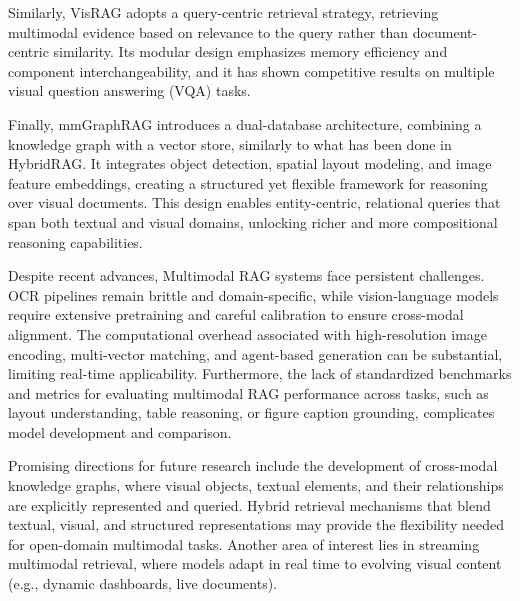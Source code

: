 \documentclass[12pt,twoside]{report}
\begin{document}
Similarly, VisRAG\cite{VisRAG} adopts a query-centric retrieval strategy, retrieving multimodal evidence based on relevance to the query rather than document-centric similarity. Its modular design emphasizes memory efficiency and component interchangeability, and it has shown competitive results on multiple visual question answering (VQA) tasks.

Finally, mmGraphRAG\cite{mmGraphRAG} introduces a dual-database architecture, combining a knowledge graph with a vector store, similarly to what has been done in HybridRAG\cite{HybridRAG}. It integrates object detection, spatial layout modeling, and image feature embeddings, creating a structured yet flexible framework for reasoning over visual documents. This design enables entity-centric, relational queries that span both textual and visual domains, unlocking richer and more compositional reasoning capabilities.

Despite recent advances, Multimodal RAG systems face persistent challenges. OCR pipelines remain brittle and domain-specific, while vision-language models require extensive pretraining and careful calibration to ensure cross-modal alignment. The computational overhead associated with high-resolution image encoding, multi-vector matching, and agent-based generation can be substantial, limiting real-time applicability. Furthermore, the lack of standardized benchmarks and metrics for evaluating multimodal RAG performance across tasks, such as layout understanding, table reasoning, or figure caption grounding, complicates model development and comparison.

Promising directions for future research include the development of cross-modal knowledge graphs, where visual objects, textual elements, and their relationships are explicitly represented and queried. Hybrid retrieval mechanisms that blend textual, visual, and structured representations may provide the flexibility needed for open-domain multimodal tasks. Another area of interest lies in streaming multimodal retrieval, where models adapt in real time to evolving visual content (e.g., dynamic dashboards, live documents).
\end{document}
